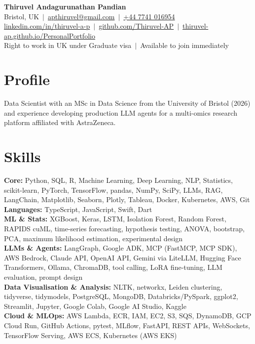 \documentclass[a4paper,11pt]{article}
\begin{document}
\fontsize{11}{13.2}\selectfont

\begin{center}
  {\LARGE\bfseries Thiruvel Andagurunathan Pandian}\\[3pt]
  Bristol, UK \,$|$\, \href{mailto:apthiruvel@gmail.com}{apthiruvel@gmail.com} \,$|$\, \href{tel:+447741016954}{+44 7741 016954}\\[1pt]
\href{https://www.linkedin.com/in/thiruvel-a-p/}{linkedin.com/in/thiruvel-a-p} \,$|$\, \href{https://github.com/Thiruvel-AP}{github.com/Thiruvel-AP} \,$|$\, \href{https://thiruvel-ap.github.io/PersonalPortfolio/}{thiruvel-ap.github.io/PersonalPortfolio}\\[1pt]
  Right to work in UK under Graduate visa \,$|$\, Available to join immediately
\end{center}

\section{Profile}
Data Scientist with an MSc in Data Science from the University of Bristol (2026) and experience developing production LLM agents for a multi-omics research platform affiliated with AstraZeneca.

\section{Skills}
\textbf{Core:} Python, SQL, R, Machine Learning, Deep Learning, NLP, Statistics, scikit-learn, PyTorch, TensorFlow, pandas, NumPy, SciPy, LLMs, RAG, LangChain, Matplotlib, Seaborn, Plotly, Tableau, Docker, Kubernetes, AWS, Git\\[2pt]
\textbf{Languages:} TypeScript, JavaScript, Swift, Dart\\[2pt]
\textbf{ML \& Stats:} XGBoost, Keras, LSTM, Isolation Forest, Random Forest, RAPIDS cuML, time-series forecasting, hypothesis testing, ANOVA, bootstrap, PCA, maximum likelihood estimation, experimental design\\[2pt]
\textbf{LLMs \& Agents:} LangGraph, Google ADK, MCP (FastMCP, MCP SDK), AWS Bedrock, Claude API, OpenAI API, Gemini via LiteLLM, Hugging Face Transformers, Ollama, ChromaDB, tool calling, LoRA fine-tuning, LLM evaluation, prompt design\\[2pt]
\textbf{Data Visualisation \& Analysis:} NLTK, networkx, Leiden clustering, tidyverse, tidymodels, PostgreSQL, MongoDB, Databricks/PySpark, ggplot2, Streamlit, Jupyter, Google Colab, Google AI Studio, Kaggle\\[2pt]
\textbf{Cloud \& MLOps:} AWS Lambda, ECR, IAM, EC2, S3, SQS, DynamoDB, GCP Cloud Run, GitHub Actions, pytest, MLflow, FastAPI, REST APIs, WebSockets, TensorFlow Serving, AWS ECS, Kubernetes (AWS EKS)
\end{document}
